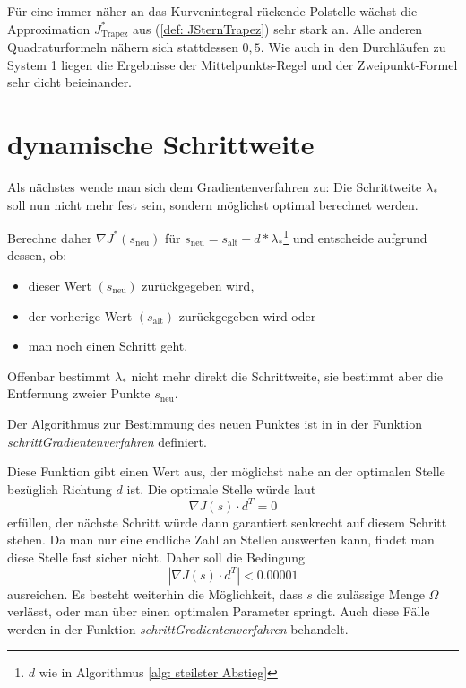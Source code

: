 \documentclass[a4paper,12pt]{report}
\newcommand{\1}{\mathds{1}}
\theoremstyle{plain} %
\theoremstyle{definition} %
\theoremstyle{remark}
\begin{document}
            Für eine immer näher an das Kurvenintegral rückende Polstelle wächst die Approximation $J^*_{\text{Trapez}}$ aus (\ref{def: JSternTrapez}) sehr stark an.
            Alle anderen Quadraturformeln nähern sich stattdessen $0,5$.
            Wie auch in den Durchläufen zu System 1 liegen die Ergebnisse der Mittelpunkts-Regel und der Zweipunkt-Formel sehr dicht beieinander.

      \section{dynamische Schrittweite}
            Als nächstes wende man sich dem Gradientenverfahren zu:
            Die Schrittweite $\lambda_*$ soll nun nicht mehr fest sein, sondern möglichst optimal berechnet werden.

            Berechne daher $\nabla J^*(s_\text{neu})$ für $s_\text{neu} = s_\text{alt}-d*\lambda_*$\footnote{$d$ wie in Algorithmus \ref{alg: steilster Abstieg}} und entscheide aufgrund dessen, ob:
            \begin{itemize}
                  \item dieser Wert $(s_\text{neu})$ zurückgegeben wird,
                  \item der vorherige Wert $(s_\text{alt})$ zurückgegeben wird oder
                  \item man noch einen Schritt geht.
            \end{itemize}
            
            Offenbar bestimmt $\lambda_*$ nicht mehr direkt die Schrittweite, sie bestimmt aber die Entfernung zweier Punkte $s_\text{neu}$.

            Der Algorithmus zur Bestimmung des neuen Punktes ist in \cite[\textit{./Funktionen.py}]{github} in der Funktion \textit{schrittGradientenverfahren} definiert.

            Diese Funktion gibt einen Wert \s aus, der möglichst nahe an der optimalen Stelle bezüglich Richtung $d$ ist.
            Die optimale Stelle würde laut \cite[S. 286]{optimierungBurkhard}
            $$\nabla J(s)\cdot d^T = 0$$
            erfüllen, der nächste Schritt würde dann garantiert senkrecht auf diesem Schritt stehen.
            Da man nur eine endliche Zahl an Stellen auswerten kann, findet man diese Stelle fast sicher nicht.
            Daher soll die Bedingung
            $$|\nabla J(s)\cdot d^T| < 0.00001$$
            ausreichen.
            Es besteht weiterhin die Möglichkeit, dass $s$ die zulässige Menge $\Omega$ verlässt, oder man über einen optimalen Parameter springt.
            Auch diese Fälle werden in der Funktion \textit{schrittGradientenverfahren} behandelt.
\end{document}
